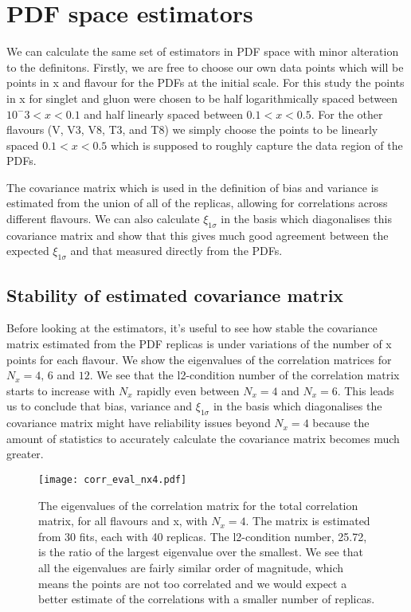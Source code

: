\section{PDF space estimators}

We can calculate the same set of estimators in PDF space with minor alteration
to the definitons. Firstly, we are free to choose our own data points which will
be points in x and flavour for the PDFs at the initial scale. For this study the
points in x for singlet and gluon were chosen to be half logarithmically spaced
between $10^-3<x<0.1$ and half linearly spaced between $0.1<x<0.5$. For the
other flavours (V, V3, V8, T3, and T8) we simply choose the points to be
linearly spaced $0.1<x<0.5$ which is supposed to roughly capture the data
region of the PDFs.

The covariance matrix which is used in the definition
of bias and variance is estimated from the union of all of the replicas, allowing
for correlations across different flavours. We can also calculate $\xi_{1\sigma}$
in the basis which diagonalises this covariance matrix and show that this gives
much good agreement between the expected $\xi_{1\sigma}$ and that measured
directly from the PDFs.

\subsection{Stability of estimated covariance matrix}

Before looking at the estimators, it's useful to see how stable the covariance
matrix estimated from the PDF replicas is under variations of the number of x
points for each flavour. We show the eigenvalues of the correlation matrices
for $N_x = 4,\,6$ and $12$. We see that the l2-condition number of the
correlation matrix starts to increase with $N_x$ rapidly even between $N_x=4$
and $N_x=6$. This leads us to conclude that bias, variance and $\xi_{1\sigma}$
in the basis which diagonalises the covariance matrix might have reliability
issues beyond $N_x = 4$ because the amount of statistics to accurately
calculate the covariance matrix becomes much greater.

\begin{figure}[]
    \centering
    \texttt{[image: corr\_eval\_nx4.pdf]}
    \caption{The eigenvalues of the correlation matrix for the total correlation
    matrix, for all flavours and x, with $N_x=4$. The matrix is estimated from
    30 fits, each with 40 replicas.
    The l2-condition number, 25.72, is the ratio of the
    largest eigenvalue over the smallest. We see that all the eigenvalues are
    fairly similar order of magnitude, which means the points are not too correlated
    and we would expect a better estimate of the correlations with a smaller
    number of replicas.}
    \label{fig:correignx4}
\end{figure}


